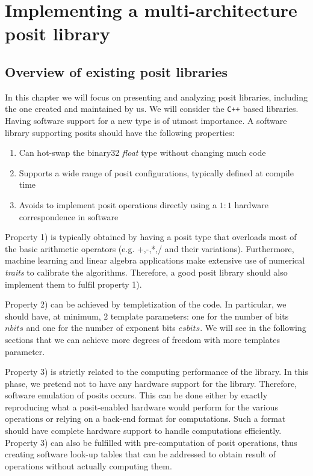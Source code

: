 \chapter{Implementing a multi-architecture posit library}


\section{Overview of existing posit libraries}

In this chapter we will focus on presenting and analyzing posit libraries, including the one created and maintained by us. We will consider the \texttt{C++} based libraries.
Having software support for a new type is of utmost importance. A software library supporting posits should have the following properties:
\begin{enumerate}
    \item Can hot-swap the binary32 \textit{float} type without changing much code
    \item Supports a wide range of posit configurations, typically defined at compile time
    \item Avoids to implement posit operations directly using a $1:1$ hardware correspondence in software 
\end{enumerate}

Property 1) is typically obtained by having a posit type that overloads most of the basic arithmetic operators (e.g. +,-,*,/ and their variations). Furthermore, machine learning and linear algebra applications make extensive use of numerical \textit{traits} to calibrate the algorithms. Therefore, a good posit library should also implement them to fulfil property 1). 

Property 2) can be achieved by templetization of the code. In particular, we should have, at minimum, $2$ template parameters: one for the number of bits $nbits$ and one for the number of exponent bits $esbits$. We will see  in the following sections that we can achieve more degrees of freedom with more templates parameter.

Property 3) is strictly related to the computing performance of the library. In this phase, we pretend not to have any hardware support for the library. Therefore, software emulation of posits occurs. This can be done either by exactly reproducing what a posit-enabled hardware would perform for the various operations or relying on a back-end format for computations. Such a format should have complete hardware support to handle computations efficiently. Property 3) can also be fulfilled with pre-computation of posit operations, thus creating software look-up tables that can be addressed to obtain result of operations without actually computing them.


